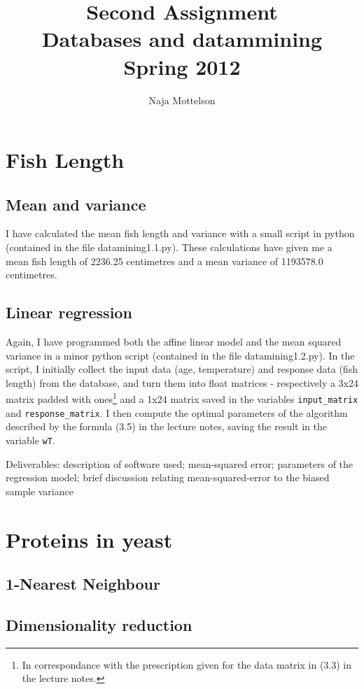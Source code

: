 \documentclass[10pt,a4paper,danish]{article}
\title{Second Assignment \\ Databases and datammining \\Spring 2012}
\author{Naja Mottelson}
\begin{document}
\maketitle
\newpage


\section{Fish Length}
\subsection{Mean and variance}
I have calculated the mean fish length and variance with a small
script in python (contained in the file datamining1.1.py). These
calculations have given me a mean fish length of 2236.25 centimetres
and a mean variance of 1193578.0 centimetres. 

\subsection{Linear regression}
Again, I have programmed both the affine linear model and the mean
squared variance in a minor python script (contained in the file
datamining1.2.py). In the script, I initially collect the input data
(age, temperature) and response data (fish length) from the database,
and turn them into float matrices - respectively a 3x24 matrix padded
with ones\footnote{In correspondance with the prescription given for
  the data matrix in (3.3) in the lecture notes.} and a 1x24 matrix
saved in the variables \texttt{input_matrix} and
\texttt{response_matrix}. I then compute the optimal parameters of the
algorithm described by the formula (3.5) in the lecture notes, saving
the result in the variable \texttt{wT}.

Deliverables: description of software used; mean-squared error;
parameters of the regression model; brief discussion relating
mean-squared-error to the biased sample variance


\section{Proteins in yeast}

\subsection{1-Nearest Neighbour}

\subsection{Dimensionality reduction}
\end{document}
